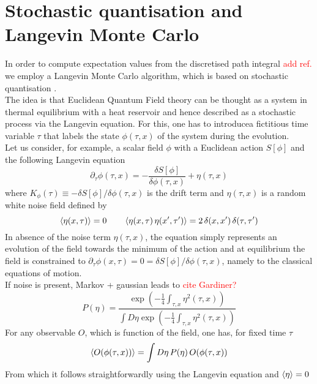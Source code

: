 \section{Stochastic quantisation and Langevin Monte Carlo}
In order to compute expectation values from the discretised path integral \textcolor{red}{add ref.} we employ a Langevin Monte Carlo algorithm, which is based on stochastic quantisation \cite{ParisiWu, Damgaard1987StochasticQuantization}. \\
The idea is that Euclidean Quantum Field theory can be thought as a system in thermal equilibrium with a heat reservoir and hence described as a stochastic process via the Langevin equation. For this, one has to introducea fictitious time variable $\tau$ that labels the state $\phi(\tau, x)$ of the system 
during the evolution. \\
Let us consider, for example, a scalar field $\phi$ with a Euclidean action $S[\phi]$ and the following Langevin equation
\begin{equation}
    \partial_\tau \phi(\tau, x) = - \frac{\delta S[\phi]}{\delta \phi (\tau, x)} + \eta (\tau, x)
    \label{eq:Langevin_scalar_full}
\end{equation}
where $K_{\phi}(\tau) \equiv -\delta S[\phi]/\delta \phi (\tau, x)$ is the drift term and $\eta (\tau, x)$ is a random white noise field defined by
\begin{equation*}
    \left\langle \eta(x,\tau) \right\rangle = 0 \qquad \left\langle \eta(x,\tau) \, \eta(x',\tau') \right\rangle = 2 \, \delta(x, x') \, \delta (\tau, \tau')
\end{equation*}
In absence of the noise term $\eta(\tau,x)$, the equation simply represents an evolution of the field towards the minimum of the action and at equilibrium the field is constrained to $\partial_\tau \phi(x,\tau) = 0 = \delta S[\phi]/\delta \phi (\tau, x)$, namely to the classical equations of motion.\\
If noise is present, Markov + gaussian leads to \textcolor{red}{cite Gardiner?} 
\begin{equation*}
    P(\eta) = \frac{\exp\left(-\frac{1}{4}\int_{\tau,x} \eta^2(\tau, x)\right)}{\int D\eta \exp\left(-\frac{1}{4}\int_{\tau,x} \eta^2(\tau,x)\right)}
\end{equation*}
For any observable $O$, which is function of the field, one has, for fixed time $\tau$
\begin{equation*}
    \left\langle O(\phi(\tau, x)) \right\rangle = \int D\eta \, P(\eta) \, O(\phi(\tau, x))
\end{equation*}
From which it follows straightforwardly using the Langevin equation and $\left\langle \eta \right\rangle = 0$
